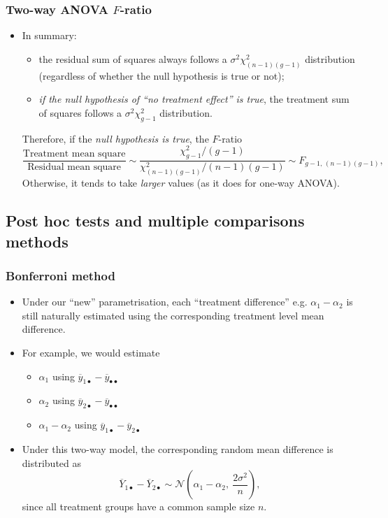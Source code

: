 \documentclass[a4paper]{article}
\begin{document}
\subsubsection{Two-way ANOVA \( F \)-ratio}
\begin{itemize}
	\item In summary:
	\begin{itemize}
		\item the residual sum of squares always follows a \( \sigma^2\chi^2_{(n-1)(g-1)} \) distribution (regardless of whether the null hypothesis is true or not);
		\item \textit{if the null hypothesis of ``no treatment effect'' is true}, the treatment sum of squares follows a \( \sigma^2\chi^2_{g-1} \) distribution.
	\end{itemize}
	Therefore, if the \textit{null hypothesis is true}, the \( F \)-ratio
	\[
		\frac{\text{Treatment mean square}}{\text{Residual mean square}} \sim \frac{\chi^2_{g-1}/(g-1)}{\chi^2_{(n-1)(g-1)}/(n-1)(g-1)}\sim F_{g-1,\,(n-1)(g-1)},
	\]
	Otherwise, it tends to take \textit{larger} values (as it does for one-way ANOVA).
\end{itemize}
\subsection{Post hoc tests and multiple comparisons methods}
\subsubsection{Bonferroni method}
\begin{itemize}
	\item Under our ``new'' parametrisation, each ``treatment difference'' e.g. \( \alpha_1 - \alpha_2 \) is still naturally estimated using the corresponding treatment level mean difference.
	\item For example, we would estimate
	\begin{itemize}
		\item \( \alpha_1 \) using \( \overline{y}_{1\bullet} - \overline{y}_{\bullet\bullet} \) 
		\item \( \alpha_2 \) using \( \overline{y}_{2\bullet} - \overline{y}_{\bullet\bullet} \) 
		\item \( \alpha_1 - \alpha_2 \) using \( \overline{y}_{1\bullet} - \overline{y}_{2\bullet} \) 
	\end{itemize}
	\item Under this two-way model, the corresponding random mean difference is distributed as
	\[
		\overline Y_{1\bullet}-\overline Y_{2\bullet}\sim \mathcal{N}\left( \alpha_1-\alpha_2,\ \frac{2\sigma^2}{n} \right),
	\]
	since all treatment groups have a common sample size \( n \).
\end{itemize}
\end{document}
